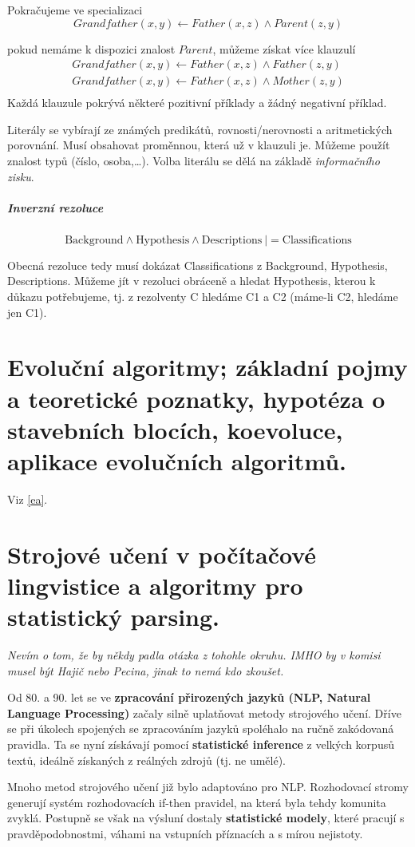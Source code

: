 \documentclass[11pt]{report} %
\numberwithin{equation}{section}
\begin{document}
Pokračujeme ve specializaci
$$Grandfather(x,y) \gets Father(x,z) \wedge Parent(z,y)$$

pokud nemáme k dispozici znalost $Parent$, můžeme získat více klauzulí
\begin{align*}
Grandfather(x,y) \gets Father(x,z) \wedge Father(z,y) \\
Grandfather(x,y) \gets Father(x,z) \wedge Mother(z,y) \\
\end{align*}
Každá klauzule pokrývá některé pozitivní příklady a žádný negativní příklad.

Literály se vybírají ze známých predikátů, rovnosti/nerovnosti a aritmetických porovnání. Musí obsahovat proměnnou, která už v klauzuli je. Můžeme použít znalost typů (číslo, osoba,\dots). Volba literálu se dělá na základě \textit{informačního zisku}.

\subparagraph{Inverzní rezoluce}
$$\text{Background} \wedge \text{Hypothesis} \wedge \text{Descriptions}\ {|}= \text{Classifications}$$

Obecná rezoluce tedy musí dokázat Classifications z Background, Hypothesis, Descriptions. Můžeme jít v rezoluci obráceně a hledat Hypothesis, kterou k důkazu potřebujeme, tj. z rezolventy C hledáme C1 a C2 (máme-li C2, hledáme jen C1).


\section{Evoluční algoritmy; základní pojmy a teoretické poznatky, hypotéza o stavebních blocích, koevoluce, aplikace evolučních algoritmů.}
Viz \ref{ea}.

\section{Strojové učení v počítačové lingvistice a algoritmy pro statistický parsing.}
\textit{Nevím o tom, že by někdy padla otázka z tohohle okruhu. IMHO by v komisi musel být Hajič nebo Pecina, jinak to nemá kdo zkoušet.}

Od 80. a 90. let se ve \textbf{zpracování přirozených jazyků (NLP, Natural Language Processing)} začaly silně uplatňovat metody strojového učení. Dříve se při úkolech spojených se zpracováním jazyků spoléhalo na ručně zakódovaná pravidla. Ta se nyní získávají pomocí \textbf{statistické inference} z velkých korpusů textů, ideálně získaných z reálných zdrojů (tj. ne umělé). 

Mnoho metod strojového učení již bylo adaptováno pro NLP. Rozhodovací stromy generují systém rozhodovacích if-then pravidel, na která byla tehdy komunita zvyklá. Postupně se však na výsluní dostaly \textbf{statistické modely}, které pracují s pravděpodobnostmi, váhami na vstupních příznacích a s mírou nejistoty.
\end{document}
